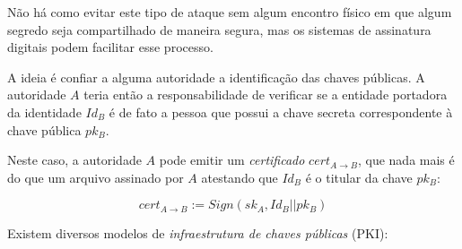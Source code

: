 Não há como evitar este tipo de ataque sem algum encontro físico em que algum segredo seja compartilhado de maneira segura, mas os sistemas de assinatura digitais podem facilitar esse processo.

A ideia é confiar a alguma autoridade a identificação das chaves públicas.
A autoridade $A$ teria então a responsabilidade de verificar se a entidade portadora da identidade $Id_B$ é de fato a pessoa que possui a chave secreta correspondente à chave pública $pk_B$.

Neste caso, a autoridade $A$ pode emitir um {\em certificado} $cert_{A \to B}$, que nada mais é do que um arquivo assinado por $A$ atestando que \(Id_B\) é o titular da chave $pk_B$:

\begin{displaymath}
  cert_{A \to B} := Sign(sk_A, Id_B || pk_B)
\end{displaymath}


Existem diversos modelos de {\em infraestrutura de chaves públicas} (PKI):

